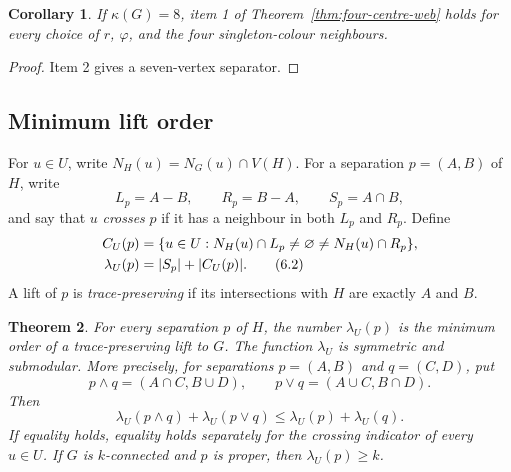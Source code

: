 \documentclass[11pt]{amsart}
\newtheorem{theorem}{Theorem}[section]
\newtheorem{corollary}[theorem]{Corollary}
\begin{document}
\begin{corollary}\label{cor:eight-connected-four-centre}
If $\kappa(G)=8$, item 1 of Theorem~\ref{thm:four-centre-web} holds for
every choice of $r$, $\varphi$, and the four singleton-colour neighbours.
\end{corollary}

\begin{proof}
Item 2 gives a seven-vertex separator.
\end{proof}

\subsection{Minimum lift order}

For $u\in U$, write $N_H(u)=N_G(u)\cap V(H)$.  For a separation
$p=(A,B)$ of $H$, write
\[
 L_p=A-B,\qquad R_p=B-A,\qquad S_p=A\cap B,
\]
and say that $u$ \emph{crosses} $p$ if it has a neighbour in both $L_p$
and $R_p$.  Define
\begin{align}
 C_U(p)&=\{u\in U:N_H(u)\cap L_p\ne\varnothing\ne
                         N_H(u)\cap R_p\},\notag\\
 \lambda_U(p)&=|S_p|+|C_U(p)|.                         \tag{6.2}
\end{align}
A lift of $p$ is \emph{trace-preserving} if its intersections with $H$ are
exactly $A$ and $B$.

\begin{theorem}\label{thm:lift-order}
For every separation $p$ of $H$, the number $\lambda_U(p)$ is the minimum
order of a trace-preserving lift to $G$.  The function $\lambda_U$ is
symmetric and submodular.  More precisely, for separations $p=(A,B)$ and
$q=(C,D)$, put
\[
 p\wedge q=(A\cap C,B\cup D),\qquad
 p\vee q=(A\cup C,B\cap D).
\]
Then
\[
 \lambda_U(p\wedge q)+\lambda_U(p\vee q)
       \leq\lambda_U(p)+\lambda_U(q).                  \tag{6.3}
\]
If equality holds, equality holds separately for the crossing indicator
of every $u\in U$.  If $G$ is $k$-connected and $p$ is proper, then
$\lambda_U(p)\geq k$.
\end{theorem}
\end{document}
